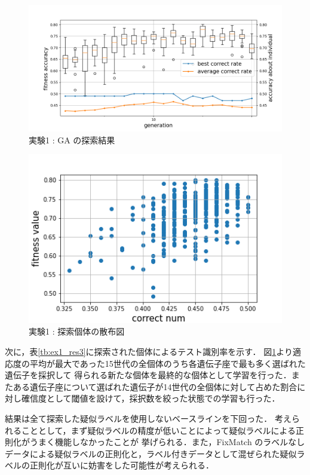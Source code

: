 \begin{figure}[h]
	\begin{center}
		\includegraphics[scale=4.3]{./images/ex1_res_graph.png}
		\caption{実験1 : GA の探索結果\label{fig:ex1_res1}}
	\end{center}
\end{figure}
\clearpage

\begin{figure}[h]
	\begin{center}
		\includegraphics[scale=1.0]{./images/ex1_res_img.png}
		\caption{実験1 : 探索個体の散布図\label{fig:ex1_res2}}
	\end{center}
\end{figure}
\clearpage

次に，表\ref{tb:ex1_res3}に探索された個体によるテスト識別率を示す．
図\ref{fig:ex1_res1}より適応度の平均が最大であった15世代の全個体のうち各遺伝子座で最も多く選ばれた遺伝子を採択して
得られる新たな個体を最終的な個体として学習を行った．またある遺伝子座について選ばれた遺伝子が14世代の全個体に対して占めた割合に対し確信度として閾値を設けて，採択数を絞った状態での学習も行った．

結果は全て探索した疑似ラベルを使用しないベースラインを下回った．
考えられることとして，まず疑似ラベルの精度が低いことによって疑似ラベルによる正則化がうまく機能しなかったことが
挙げられる．また，FixMatch のラベルなしデータによる疑似ラベルの正則化と，ラベル付きデータとして混ぜられた疑似ラベルの正則化が互いに妨害をした可能性が考えられる．

